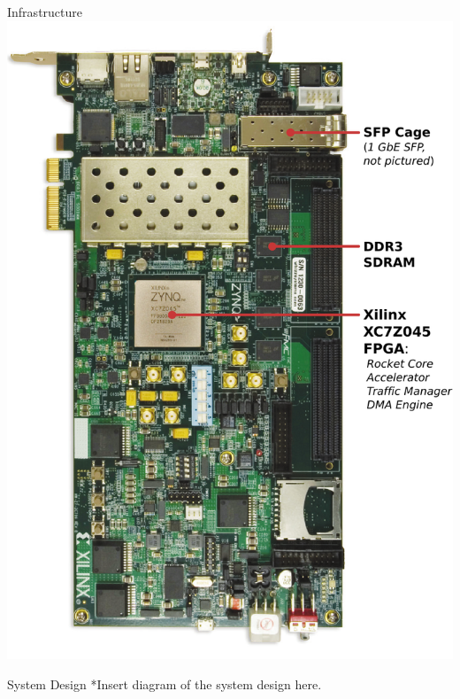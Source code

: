 \begin{block}{Infrastructure}
    \includegraphics[width=\linewidth]{img/zc706.pdf}


\end{block}

\vspace{1ex}

\begin{block}{System Design}
*Insert diagram of the system design here.
\end{block}

